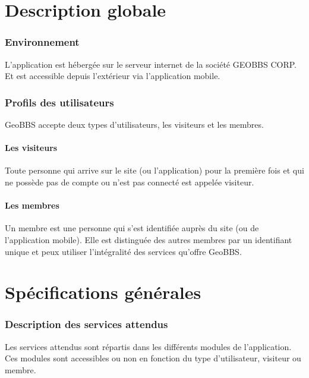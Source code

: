 \documentclass[a4paper,12pt]{report}
\begin{document}
\begin{onehalfspace}
\chapter{Description globale}

\subsection{Environnement} %
\label{sub:environnement}
L’application est hébergée sur le serveur internet de la société GEOBBS CORP. Et est accessible depuis l’extérieur via l'application mobile.


\subsection{Profils des utilisateurs} %
\label{sub:profils_des_utilisateurs}

GeoBBS accepte deux types d’utilisateurs, les visiteurs et les membres.

\subsubsection{Les visiteurs}
Toute personne qui arrive sur le site (ou l'application) pour la première fois et qui ne possède pas de compte ou n’est pas connecté est appelée visiteur.

\subsubsection{Les membres}
Un membre est une personne qui s’est identifiée auprès du site (ou de l'application mobile). Elle est distinguée des autres membres par un identifiant unique et peux utiliser l’intégralité des services qu’offre GeoBBS.


\chapter{Spécifications générales} %
\label{cha:sp_cifications_g_n_rales}

\subsection{Description des services attendus}

Les services attendus sont répartis dans les différents modules de l’application. Ces modules sont accessibles ou non en fonction du type d’utilisateur, visiteur ou membre.


\end{onehalfspace}
\end{document}
